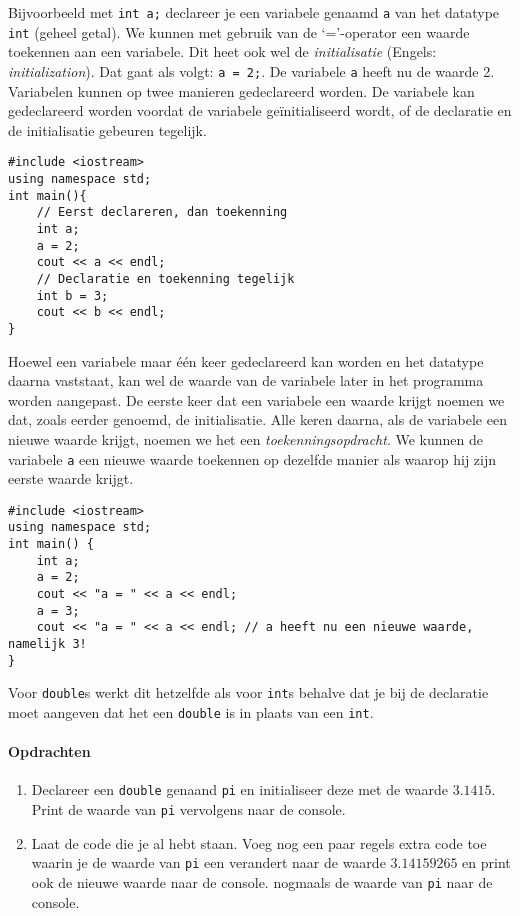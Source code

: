\documentclass[12pt,a4paper]{article}
\newcommand{\icode}{\lstinline}
\begin{document}
Bijvoorbeeld met \icode{int a;} declareer je een variabele genaamd \icode{a} van het datatype 
\icode{int} (geheel getal). We kunnen met gebruik van de `='-operator een waarde toekennen aan een variabele. Dit heet ook wel de \emph{initialisatie} (Engels: \emph{initialization}).
Dat gaat als volgt: \icode{a = 2;}. De variabele \icode{a} heeft nu de waarde 2.
Variabelen kunnen op twee manieren gedeclareerd worden. De variabele kan gedeclareerd worden 
voordat de variabele ge\"initialiseerd wordt, of de declaratie en de initialisatie gebeuren tegelijk. 
\begin{lstlisting}
#include <iostream> 
using namespace std; 
int main(){
	// Eerst declareren, dan toekenning 
	int a; 
	a = 2; 
	cout << a << endl; 
	// Declaratie en toekenning tegelijk
	int b = 3; 
	cout << b << endl; 
}
\end{lstlisting}
Hoewel een variabele maar één keer gedeclareerd kan worden en het datatype daarna vaststaat, kan 
wel de waarde van de variabele later in het programma worden aangepast. De eerste keer dat een variabele een waarde krijgt noemen we dat, zoals eerder genoemd, de initialisatie. Alle keren daarna, als de variabele een nieuwe waarde krijgt, noemen we het een \emph{toekenningsopdracht}. We kunnen de variabele \icode{a} een nieuwe waarde toekennen op dezelfde manier als waarop hij zijn eerste waarde krijgt. 
\begin{lstlisting}
#include <iostream> 
using namespace std;
int main() {
	int a; 
	a = 2; 
	cout << "a = " << a << endl; 
	a = 3; 
	cout << "a = " << a << endl; // a heeft nu een nieuwe waarde, namelijk 3! 
}
\end{lstlisting}
Voor \icode{double}s werkt dit hetzelfde als voor \icode{int}s behalve dat je bij de declaratie moet 
aangeven dat het een \icode{double} is in plaats van een \icode{int}. 
\paragraph{Opdrachten}
\begin{enumerate} 
\item 
	Declareer een \icode{double} genaand \icode{pi} en initialiseer deze met de waarde $3.1415$. 
Print de waarde van \icode{pi} vervolgens naar de console. 
\item 
	Laat de code die je al hebt staan. Voeg nog een paar regels extra code toe waarin je de waarde van \icode{pi} een verandert naar de waarde $3.14159265$ en print ook de nieuwe waarde naar de console. 
nogmaals de waarde van \icode{pi} naar de console. 
\end{enumerate} 
\end{document}
